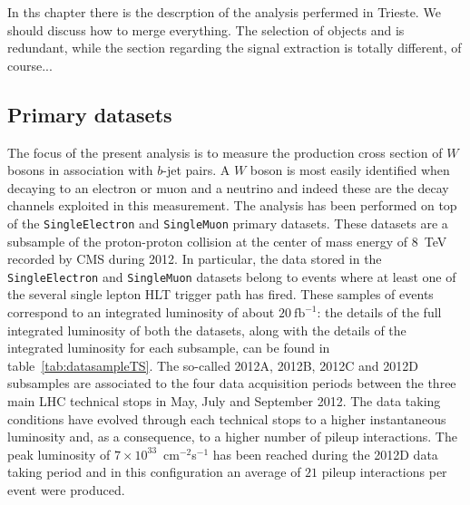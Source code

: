 In ths chapter there is the descrption of the analysis perfermed in Trieste.
We should discuss how to merge everything. 
The selection of objects and is redundant, while the section regarding the signal extraction 
is totally different, of course...


\subsection{Primary datasets}
\label{sec:dataset}

The focus of the present analysis is to measure the production cross section 
of $W$ bosons in association with $b$-jet pairs. A $W$ boson is most easily 
identified when decaying to an electron or muon and a neutrino and indeed these are 
the decay channels exploited in this measurement. 
The analysis has been performed on top of the 
\texttt{SingleElectron} and \texttt{SingleMuon} primary datasets. These datasets are a subsample
of the proton-proton collision at the center of mass energy of $8$~TeV 
recorded by CMS during 2012.
In particular, the data stored in the \texttt{SingleElectron} and \texttt{SingleMuon} 
datasets belong to events where at least 
one of the several single lepton HLT trigger path has fired.
These samples of events correspond to an integrated luminosity of about  
$20~\mathrm{fb}^{-1}$: the details of the full integrated luminosity
of both the datasets,
along with the details of the integrated luminosity 
for each subsample, can be found in table~\ref{tab:datasampleTS}.
The so-called 2012A, 2012B, 2012C and 2012D subsamples are associated to the four data 
acquisition periods between the three main LHC technical stops in May, July 
and September 2012. The data taking conditions have evolved through each 
technical stops to a higher instantaneous luminosity and, as a consequence,
to a higher number of pileup interactions.
The peak luminosity of $7\times10^{33}$~cm$^{-2}$s$^{-1}$ 
has been reached during the 2012D data taking period and in this configuration 
an average of $21$ pileup interactions per event were produced.

